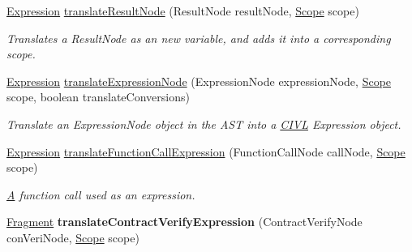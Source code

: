 \begin{DoxyCompactItemize}
\item 
\hyperlink{interfaceedu_1_1udel_1_1cis_1_1vsl_1_1civl_1_1model_1_1IF_1_1expression_1_1Expression}{Expression} \hyperlink{classedu_1_1udel_1_1cis_1_1vsl_1_1civl_1_1model_1_1common_1_1FunctionTranslator_abffed5c830dabfc2d81fcb88b4513767}{translate\+Result\+Node} (Result\+Node result\+Node, \hyperlink{interfaceedu_1_1udel_1_1cis_1_1vsl_1_1civl_1_1model_1_1IF_1_1Scope}{Scope} scope)
\begin{DoxyCompactList}\small\item\em Translates a Result\+Node as an new variable, and adds it into a corresponding scope. \end{DoxyCompactList}\item 
\hyperlink{interfaceedu_1_1udel_1_1cis_1_1vsl_1_1civl_1_1model_1_1IF_1_1expression_1_1Expression}{Expression} \hyperlink{classedu_1_1udel_1_1cis_1_1vsl_1_1civl_1_1model_1_1common_1_1FunctionTranslator_af5d48154e1e42420091ab609a97d93e0}{translate\+Expression\+Node} (Expression\+Node expression\+Node, \hyperlink{interfaceedu_1_1udel_1_1cis_1_1vsl_1_1civl_1_1model_1_1IF_1_1Scope}{Scope} scope, boolean translate\+Conversions)
\begin{DoxyCompactList}\small\item\em Translate an Expression\+Node object in the A\+S\+T into a \hyperlink{classedu_1_1udel_1_1cis_1_1vsl_1_1civl_1_1CIVL}{C\+I\+V\+L} Expression object. \end{DoxyCompactList}\item 
\hyperlink{interfaceedu_1_1udel_1_1cis_1_1vsl_1_1civl_1_1model_1_1IF_1_1expression_1_1Expression}{Expression} \hyperlink{classedu_1_1udel_1_1cis_1_1vsl_1_1civl_1_1model_1_1common_1_1FunctionTranslator_a1d0dd34e986dbcef67c5deeffca737ea}{translate\+Function\+Call\+Expression} (Function\+Call\+Node call\+Node, \hyperlink{interfaceedu_1_1udel_1_1cis_1_1vsl_1_1civl_1_1model_1_1IF_1_1Scope}{Scope} scope)
\begin{DoxyCompactList}\small\item\em \hyperlink{structA}{A} function call used as an expression. \end{DoxyCompactList}\item 
\hypertarget{classedu_1_1udel_1_1cis_1_1vsl_1_1civl_1_1model_1_1common_1_1FunctionTranslator_a5a2c9a4487df6e8c582102eaf8caac5c}{}\hyperlink{interfaceedu_1_1udel_1_1cis_1_1vsl_1_1civl_1_1model_1_1IF_1_1Fragment}{Fragment} {\bfseries translate\+Contract\+Verify\+Expression} (Contract\+Verify\+Node con\+Veri\+Node, \hyperlink{interfaceedu_1_1udel_1_1cis_1_1vsl_1_1civl_1_1model_1_1IF_1_1Scope}{Scope} scope)\label{classedu_1_1udel_1_1cis_1_1vsl_1_1civl_1_1model_1_1common_1_1FunctionTranslator_a5a2c9a4487df6e8c582102eaf8caac5c}


\end{DoxyCompactItemize}
